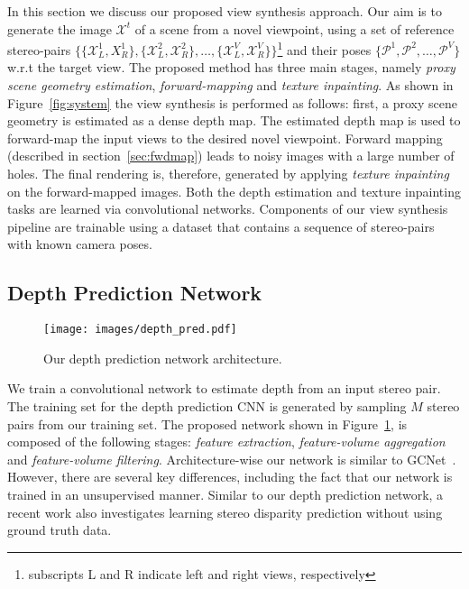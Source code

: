 \documentclass[runningheads]{llncs}
\newcommand{\squeezeup}{\vspace{-5.5mm}}
\begin{document}
\sloppy In this section we discuss our proposed view synthesis approach. Our aim is to generate the image $\mathcal{X}^{t}$ of a scene from a novel viewpoint, using a set of reference stereo-pairs $\{\{\mathcal{X}^{1}_{L}, X^{1}_{R}\},\{\mathcal{X}^{2}_{L}, \mathcal{X}^{2}_{R}\}, \dots,  \{\mathcal{X}^{V}_{L}, \mathcal{X}^{V}_{R}\}\}$\footnote{subscripts L and R indicate left and right views, respectively} and their poses $\{\mathcal{P}^{1}, \mathcal{P}^{2}, \dots, \mathcal{P}^{V}\}$ w.r.t the target view. The proposed method has three main stages, namely \textit{proxy scene geometry estimation}, \textit{forward-mapping} and \textit{texture inpainting}. As shown in Figure~\ref{fig:system} the view synthesis is performed as follows: first, a proxy scene geometry is estimated as a dense depth map. The estimated depth map is used to forward-map the input views to the desired novel viewpoint. Forward mapping (described in section~\ref{sec:fwdmap}) leads to noisy images with a large number of holes. The final rendering is, therefore, generated by applying \textit{texture inpainting} on the forward-mapped images. Both the depth estimation and texture inpainting tasks are learned via convolutional networks. Components of our view synthesis pipeline are trainable using a dataset that contains a sequence of stereo-pairs with known camera poses. 
\newline

\subsection{Depth Prediction Network}
\begin{figure}[htb!]
  \centering
  \texttt{[image: images/depth\_pred.pdf]}
  \caption{Our depth prediction network architecture.}
  \label{fig:depth}
\end{figure}

We train a convolutional network to estimate depth from an input stereo pair. The training set for the depth prediction CNN is generated by sampling $M$ stereo pairs from our training set. The proposed network shown in Figure~\ref{fig:depth}, is composed of the following stages: \textit{feature extraction}, \textit{feature-volume aggregation} and \textit{feature-volume filtering}. Architecture-wise our network is similar to  GCNet~\cite{gcnet}. However, there are several key differences, including the fact that our network is trained in an unsupervised manner. Similar to our depth prediction network, a recent work \cite{zhong2017self} also investigates learning stereo disparity prediction without using ground truth data.
\newline
\end{document}
